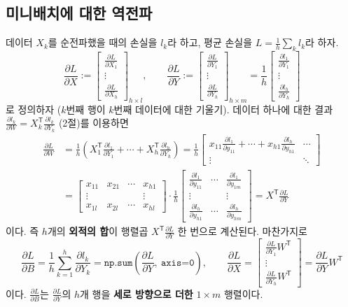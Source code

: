 \documentclass[11pt,a4paper]{article}
\newcommand{\T}{^{\mathsf T}}
\newcommand{\pd}[2]{\frac{\partial #1}{\partial #2}}
\begin{document}
\subsection{미니배치에 대한 역전파}

데이터 $X_k$를 순전파했을 때의 손실을 $l_k$라 하고, 평균 손실을 $L=\frac1h\sum_k l_k$라 하자.
\[
\pd{L}{X}:=
\begin{bmatrix}
\pd{L}{X_1}\\ \vdots\\ \pd{L}{X_h}
\end{bmatrix}_{h\times l},
\qquad
\pd{L}{Y}:=
\begin{bmatrix}
\pd{L}{Y_1}\\ \vdots\\ \pd{L}{Y_h}
\end{bmatrix}_{h\times m}
=\frac1h
\begin{bmatrix}
\pd{l_1}{Y_1}\\ \vdots\\ \pd{l_h}{Y_h}
\end{bmatrix}
\]
로 정의하자 ($k$번째 행이 $k$번째 데이터에 대한 기울기).
데이터 하나에 대한 결과 $\pd{l_k}{W}=X_k\T\pd{l_k}{Y_k}$ (2절)를 이용하면
\[
\begin{aligned}
\pd{L}{W}
&=\frac1h\left(X_1\T\pd{l_1}{Y_1}+\cdots+X_h\T\pd{l_h}{Y_h}\right)
=\frac1h
\begin{bmatrix}
x_{11}\pd{l_1}{y_{11}}+\cdots+x_{h1}\pd{l_h}{y_{h1}} & \cdots\\
\vdots&\ddots
\end{bmatrix}\\
&=
\begin{bmatrix}
x_{11}&x_{21}&\cdots&x_{h1}\\
\vdots&&&\vdots\\
x_{1l}&x_{2l}&\cdots&x_{hl}
\end{bmatrix}
\cdot\frac1h
\begin{bmatrix}
\pd{l_1}{y_{11}}&\cdots&\pd{l_1}{y_{1m}}\\
\vdots&&\vdots\\
\pd{l_h}{y_{h1}}&\cdots&\pd{l_h}{y_{hm}}
\end{bmatrix}
=X\T\pd{L}{Y}
\end{aligned}
\]
이다. 즉 $h$개의 \textbf{외적의 합}이 행렬곱 $X\T\pd{L}{Y}$ 한 번으로 계산된다.
마찬가지로
\[
\pd{L}{B}=\frac1h\sum_{k=1}^{h}\pd{l_k}{Y_k}
=\texttt{np.sum}\left(\pd{L}{Y},\ \texttt{axis=0}\right),
\qquad
\pd{L}{X}=
\begin{bmatrix}
\pd{L}{Y_1}W\T\\ \vdots\\ \pd{L}{Y_h}W\T
\end{bmatrix}
=\pd{L}{Y}W\T
\]
이다. $\pd{L}{B}$는 $\pd{L}{Y}$의 $h$개 행을 \textbf{세로 방향으로 더한} $1\times m$ 행렬이다.
\end{document}
